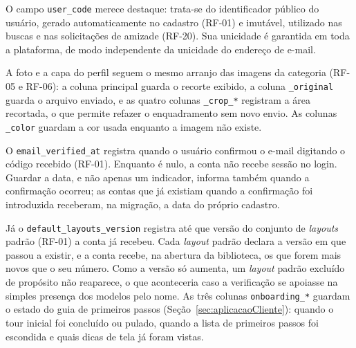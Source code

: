 O campo \texttt{user\_code} merece destaque: trata-se do identificador público do usuário, gerado automaticamente no cadastro (RF-01) e imutável, utilizado nas buscas e nas solicitações de amizade (RF-20). Sua unicidade é garantida em toda a plataforma, de modo independente da unicidade do endereço de e-mail.

A foto e a capa do perfil seguem o mesmo arranjo das imagens da categoria (RF-05 e RF-06): a coluna principal guarda o recorte exibido, a coluna \texttt{\_original} guarda o arquivo enviado, e as quatro colunas \texttt{\_crop\_*} registram a área recortada, o que permite refazer o enquadramento sem novo envio. As colunas \texttt{\_color} guardam a cor usada enquanto a imagem não existe.

O \texttt{email\_verified\_at} registra quando o usuário confirmou o e-mail digitando o código recebido (RF-01). Enquanto é nulo, a conta não recebe sessão no login. Guardar a data, e não apenas um indicador, informa também quando a confirmação ocorreu; as contas que já existiam quando a confirmação foi introduzida receberam, na migração, a data do próprio cadastro.

Já o \texttt{default\_layouts\_version} registra até que versão do conjunto de \textit{layouts} padrão (RF-01) a conta já recebeu. Cada \textit{layout} padrão declara a versão em que passou a existir, e a conta recebe, na abertura da biblioteca, os que forem mais novos que o seu número. Como a versão só aumenta, um \textit{layout} padrão excluído de propósito não reaparece, o que aconteceria caso a verificação se apoiasse na simples presença dos modelos pelo nome. As três colunas \texttt{onboarding\_*} guardam o estado do guia de primeiros passos (Seção~\ref{sec:aplicacaoCliente}): quando o tour inicial foi concluído ou pulado, quando a lista de primeiros passos foi escondida e quais dicas de tela já foram vistas.

